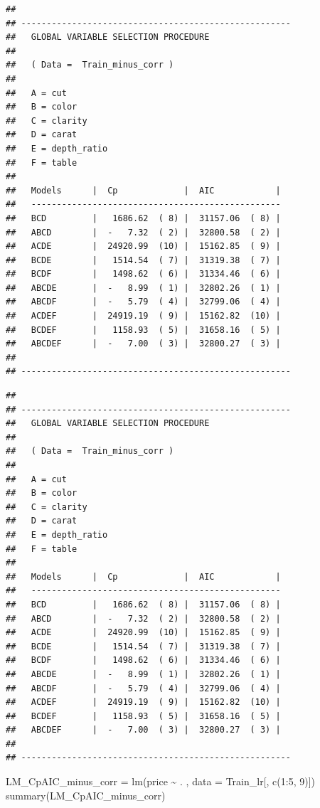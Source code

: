 \documentclass[
]{article}
\newenvironment{Shaded}{\begin{snugshade}}{\end{snugshade}}
\newcommand{\AttributeTok}[1]{\textcolor[rgb]{0.77,0.63,0.00}{#1}}
\newcommand{\DecValTok}[1]{\textcolor[rgb]{0.00,0.00,0.81}{#1}}
\newcommand{\FunctionTok}[1]{\textcolor[rgb]{0.00,0.00,0.00}{#1}}
\newcommand{\NormalTok}[1]{#1}
\newcommand{\OtherTok}[1]{\textcolor[rgb]{0.56,0.35,0.01}{#1}}
\newcommand{\SpecialCharTok}[1]{\textcolor[rgb]{0.00,0.00,0.00}{#1}}
\begin{document}
\begin{verbatim}
##
## -----------------------------------------------------
##   GLOBAL VARIABLE SELECTION PROCEDURE
##
##   ( Data =  Train_minus_corr )
##
##   A = cut
##   B = color
##   C = clarity
##   D = carat
##   E = depth_ratio
##   F = table
##
##   Models      |  Cp             |  AIC            |
##   -------------------------------------------------
##   BCD         |   1686.62  ( 8) |  31157.06  ( 8) |
##   ABCD        |  -   7.32  ( 2) |  32800.58  ( 2) |
##   ACDE        |  24920.99  (10) |  15162.85  ( 9) |
##   BCDE        |   1514.54  ( 7) |  31319.38  ( 7) |
##   BCDF        |   1498.62  ( 6) |  31334.46  ( 6) |
##   ABCDE       |  -   8.99  ( 1) |  32802.26  ( 1) |
##   ABCDF       |  -   5.79  ( 4) |  32799.06  ( 4) |
##   ACDEF       |  24919.19  ( 9) |  15162.82  (10) |
##   BCDEF       |   1158.93  ( 5) |  31658.16  ( 5) |
##   ABCDEF      |  -   7.00  ( 3) |  32800.27  ( 3) |
##
## -----------------------------------------------------
\end{verbatim}

\begin{verbatim}
##
## -----------------------------------------------------
##   GLOBAL VARIABLE SELECTION PROCEDURE
##
##   ( Data =  Train_minus_corr )
##
##   A = cut
##   B = color
##   C = clarity
##   D = carat
##   E = depth_ratio
##   F = table
##
##   Models      |  Cp             |  AIC            |
##   -------------------------------------------------
##   BCD         |   1686.62  ( 8) |  31157.06  ( 8) |
##   ABCD        |  -   7.32  ( 2) |  32800.58  ( 2) |
##   ACDE        |  24920.99  (10) |  15162.85  ( 9) |
##   BCDE        |   1514.54  ( 7) |  31319.38  ( 7) |
##   BCDF        |   1498.62  ( 6) |  31334.46  ( 6) |
##   ABCDE       |  -   8.99  ( 1) |  32802.26  ( 1) |
##   ABCDF       |  -   5.79  ( 4) |  32799.06  ( 4) |
##   ACDEF       |  24919.19  ( 9) |  15162.82  (10) |
##   BCDEF       |   1158.93  ( 5) |  31658.16  ( 5) |
##   ABCDEF      |  -   7.00  ( 3) |  32800.27  ( 3) |
##
## -----------------------------------------------------
\end{verbatim}

\begin{Shaded}
\begin{Highlighting}[]
\NormalTok{LM\_CpAIC\_minus\_corr }\OtherTok{=} \FunctionTok{lm}\NormalTok{(price }\SpecialCharTok{\textasciitilde{}}\NormalTok{ . , }\AttributeTok{data =}\NormalTok{ Train\_lr[, }\FunctionTok{c}\NormalTok{(}\DecValTok{1}\SpecialCharTok{:}\DecValTok{5}\NormalTok{, }\DecValTok{9}\NormalTok{)])}
\FunctionTok{summary}\NormalTok{(LM\_CpAIC\_minus\_corr)}
\end{Highlighting}
\end{Shaded}
\end{document}
